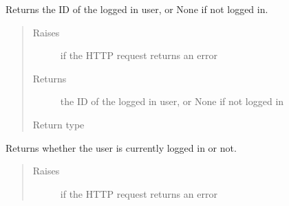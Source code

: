 \documentclass[letterpaper,10pt,english]{sphinxmanual}
\begin{document}
\begin{fulllineitems}
\begin{fulllineitems}
\label{\detokenize{autoapi/pine/client/client/index:pine.client.client.PineClient.get_my_user_id}}
\sphinxAtStartPar
Returns the ID of the logged in user, or None if not logged in.
\begin{quote}\begin{description}
\item[{Raises}] \leavevmode
\sphinxAtStartPar
{\hyperref[\detokenize{autoapi/pine/client/exceptions/index:pine.client.exceptions.PineClientHttpException}]{}} \textendash{} if the HTTP request returns an error

\item[{Returns}] \leavevmode
\sphinxAtStartPar
the ID of the logged in user, or None if not logged in

\item[{Return type}] \leavevmode
\sphinxAtStartPar
{}

\end{description}\end{quote}

\end{fulllineitems}


\begin{fulllineitems}
\label{\detokenize{autoapi/pine/client/client/index:pine.client.client.PineClient.is_logged_in}}
\sphinxAtStartPar
Returns whether the user is currently logged in or not.
\begin{quote}\begin{description}
\item[{Raises}] \leavevmode
\sphinxAtStartPar
{\hyperref[\detokenize{autoapi/pine/client/exceptions/index:pine.client.exceptions.PineClientHttpException}]{}} \textendash{} if the HTTP request returns an error


\end{description}
\end{quote}
\end{fulllineitems}
\end{fulllineitems}
\end{document}
